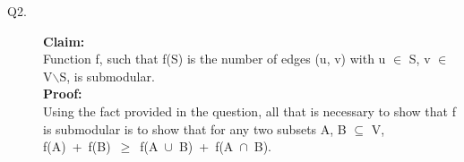 \documentclass[10pt]{csc_assignment}
\begin{document}
\begin{description}

\newpage
\item[Q2.]

\textbf{Claim:}\\
Function f, such that f(S) is the number of edges (u, v) with u $\in$ S, v $\in$ V$\backslash$S, is 
submodular.\\

\textbf{Proof:}\\
Using the fact provided in the question, all that is necessary to show that f is 
submodular is to show that for any two subsets A, B $\subseteq$ V, \mbox{f(A) + 
f(B) $\geqslant$ f(A $\cup$ B) + f(A $\cap$ B)}.\\


\end{description}
\end{document}
